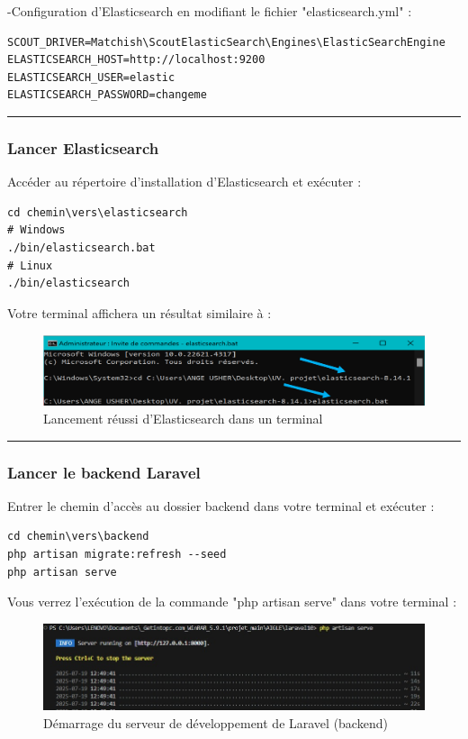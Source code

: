 \documentclass[12pt]{article}
\begin{document}
-Configuration d'Elasticsearch en modifiant le fichier "elasticsearch.yml" :
    \begin{lstlisting}
SCOUT_DRIVER=Matchish\ScoutElasticSearch\Engines\ElasticSearchEngine
ELASTICSEARCH_HOST=http://localhost:9200
ELASTICSEARCH_USER=elastic
ELASTICSEARCH_PASSWORD=changeme
    \end{lstlisting}

\rule{\linewidth}{0.2pt}
    \subsubsection{Lancer Elasticsearch}

Accéder au répertoire d'installation d'Elasticsearch et exécuter :
        \begin{lstlisting}
cd chemin\vers\elasticsearch
# Windows
./bin/elasticsearch.bat
# Linux
./bin/elasticsearch
        \end{lstlisting}

Votre terminal affichera un résultat similaire à :
    \begin{figure}[h] 
        \centering 
        \includegraphics[width=1\textwidth]{./img/elastix.png} 
        \caption{Lancement réussi d'Elasticsearch dans un terminal}
    \end{figure}

\rule{\linewidth}{0.2pt}
    \subsubsection{Lancer le backend Laravel}
Entrer le chemin d’accès au dossier backend dans votre terminal et exécuter :
        \begin{lstlisting}
cd chemin\vers\backend
php artisan migrate:refresh --seed
php artisan serve
        \end{lstlisting}
Vous verrez l'exécution de la commande "php artisan serve" dans votre terminal :
            \begin{figure}[h] 
                \centering 
                \includegraphics[width=1\textwidth]{./img/back.jpg} 
                \caption{Démarrage du serveur de développement de Laravel (backend)}
            \end{figure}
\end{document}
